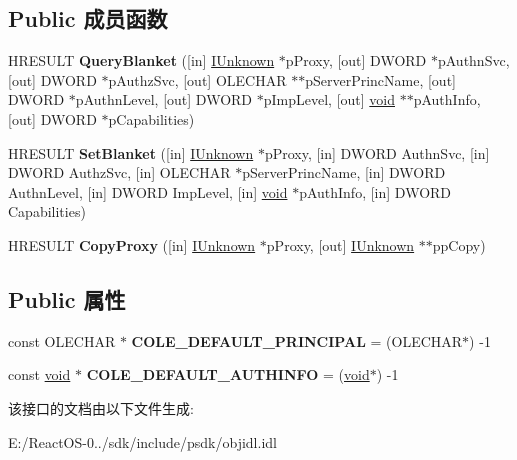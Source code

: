 \subsection*{Public 成员函数}
\begin{DoxyCompactItemize}
\item 
\mbox{\label{interface_i_client_security_a9ec3bb23d57d9005a69c87503d6e63d7}} 
H\+R\+E\+S\+U\+LT {\bfseries Query\+Blanket} (\mbox{[}in\mbox{]} \hyperlink{interface_i_unknown}{I\+Unknown} $\ast$p\+Proxy, \mbox{[}out\mbox{]} D\+W\+O\+RD $\ast$p\+Authn\+Svc, \mbox{[}out\mbox{]} D\+W\+O\+RD $\ast$p\+Authz\+Svc, \mbox{[}out\mbox{]} O\+L\+E\+C\+H\+AR $\ast$$\ast$p\+Server\+Princ\+Name, \mbox{[}out\mbox{]} D\+W\+O\+RD $\ast$p\+Authn\+Level, \mbox{[}out\mbox{]} D\+W\+O\+RD $\ast$p\+Imp\+Level, \mbox{[}out\mbox{]} \hyperlink{interfacevoid}{void} $\ast$$\ast$p\+Auth\+Info, \mbox{[}out\mbox{]} D\+W\+O\+RD $\ast$p\+Capabilities)
\item 
\mbox{\label{interface_i_client_security_ae54230b7f725615728a800949c9786e6}} 
H\+R\+E\+S\+U\+LT {\bfseries Set\+Blanket} (\mbox{[}in\mbox{]} \hyperlink{interface_i_unknown}{I\+Unknown} $\ast$p\+Proxy, \mbox{[}in\mbox{]} D\+W\+O\+RD Authn\+Svc, \mbox{[}in\mbox{]} D\+W\+O\+RD Authz\+Svc, \mbox{[}in\mbox{]} O\+L\+E\+C\+H\+AR $\ast$p\+Server\+Princ\+Name, \mbox{[}in\mbox{]} D\+W\+O\+RD Authn\+Level, \mbox{[}in\mbox{]} D\+W\+O\+RD Imp\+Level, \mbox{[}in\mbox{]} \hyperlink{interfacevoid}{void} $\ast$p\+Auth\+Info, \mbox{[}in\mbox{]} D\+W\+O\+RD Capabilities)
\item 
\mbox{\label{interface_i_client_security_ab25816ab9e2bae0ee3721ac55218cb58}} 
H\+R\+E\+S\+U\+LT {\bfseries Copy\+Proxy} (\mbox{[}in\mbox{]} \hyperlink{interface_i_unknown}{I\+Unknown} $\ast$p\+Proxy, \mbox{[}out\mbox{]} \hyperlink{interface_i_unknown}{I\+Unknown} $\ast$$\ast$pp\+Copy)
\end{DoxyCompactItemize}
\subsection*{Public 属性}
\begin{DoxyCompactItemize}
\item 
\mbox{\label{interface_i_client_security_a42481df472f40ee27baccc77c28e1d0b}} 
const O\+L\+E\+C\+H\+AR $\ast$ {\bfseries C\+O\+L\+E\+\_\+\+D\+E\+F\+A\+U\+L\+T\+\_\+\+P\+R\+I\+N\+C\+I\+P\+AL} = (O\+L\+E\+C\+H\+AR$\ast$) -\/1
\item 
\mbox{\label{interface_i_client_security_a804127cf710d7b7ba15835050013d296}} 
const \hyperlink{interfacevoid}{void} $\ast$ {\bfseries C\+O\+L\+E\+\_\+\+D\+E\+F\+A\+U\+L\+T\+\_\+\+A\+U\+T\+H\+I\+N\+FO} = (\hyperlink{interfacevoid}{void}$\ast$) -\/1
\end{DoxyCompactItemize}


该接口的文档由以下文件生成\+:\begin{DoxyCompactItemize}
\item 
E\+:/\+React\+O\+S-\/0../sdk/include/psdk/objidl.\+idl\end{DoxyCompactItemize}
